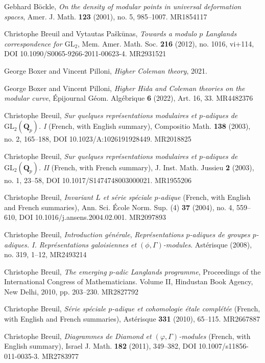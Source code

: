 \item[{[B\"oc01]}] Gebhard B\"ockle, \emph{On the density of modular points in universal deformation spaces}, Amer. J. Math. \textbf{123} (2001), no. 5, 985--1007. MR1854117
\item[{[BP12]}] Christophe Breuil and Vytautas Pa\v{s}k\={u}nas, \emph{Towards a modulo $p$ Langlands correspondence for $\mathrm{GL}_2$}, Mem. Amer. Math. Soc. \textbf{216} (2012), no. 1016, vi+114, DOI 10.1090/S0065-9266-2011-00623-4. MR2931521
\item[{[BP21]}] George Boxer and Vincent Pilloni, \emph{Higher Coleman theory}, 2021.
\item[{[BP22]}] George Boxer and Vincent Pilloni, \emph{Higher Hida and Coleman theories on the modular curve}, \'Epijournal G\'eom. Alg\'ebrique \textbf{6} (2022), Art. 16, 33. MR4482376
\item[{[Bre03a]}] Christophe Breuil, \emph{Sur quelques repr\'esentations modulaires et $p$-adiques de $\mathrm{GL}_2(\mathbf{Q}_p)$. I} (French, with English summary), Compositio Math. \textbf{138} (2003), no. 2, 165--188, DOI 10.1023/A:1026191928449. MR2018825
\item[{[Bre03b]}] Christophe Breuil, \emph{Sur quelques repr\'esentations modulaires et $p$-adiques de $\mathrm{GL}_2(\mathbf{Q}_p)$. II} (French, with French summary), J. Inst. Math. Jussieu \textbf{2} (2003), no. 1, 23--58, DOI 10.1017/S1474748003000021. MR1955206
\item[{[Bre04]}] Christophe Breuil, \emph{Invariant $L$ et s\'erie sp\'eciale $p$-adique} (French, with English and French summaries), Ann. Sci. \'Ecole Norm. Sup. (4) \textbf{37} (2004), no. 4, 559--610, DOI 10.1016/j.ansens.2004.02.001. MR2097893
\item[{[Bre08]}] Christophe Breuil, \emph{Introduction g\'en\'erale}, \emph{Repr\'esentations $p$-adiques de groupes $p$-adiques. I. Repr\'esentations galoisiennes et $(\phi,\Gamma)$-modules}. Ast\'erisque (2008), no. 319, 1--12, MR2493214
\item[{[Bre10a]}] Christophe Breuil, \emph{The emerging $p$-adic Langlands programme}, Proceedings of the International Congress of Mathematicians. Volume II, Hindustan Book Agency, New Delhi, 2010, pp. 203--230. MR2827792
\item[{[Bre10b]}] Christophe Breuil, \emph{S\'erie sp\'eciale $p$-adique et cohomologie \'etale compl\'et\'ee} (French, with English and French summaries), Ast\'erisque \textbf{331} (2010), 65--115. MR2667887
\item[{[Bre11]}] Christophe Breuil, \emph{Diagrammes de Diamond et $(\varphi,\Gamma)$-modules} (French, with English summary), Israel J. Math. \textbf{182} (2011), 349--382, DOI 10.1007/s11856-011-0035-3. MR2783977
